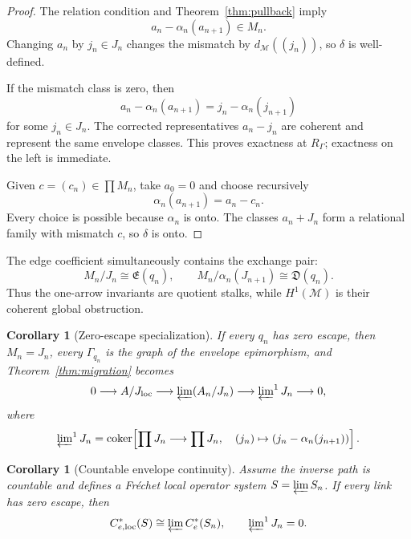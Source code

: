 \documentclass[11pt,a4paper]{amsart}
\theoremstyle{plain}
\newtheorem{corollary}[theorem]{Corollary}
\theoremstyle{definition}
\newcommand{\Ce}{C_e^*}
\newcommand{\Esc}{\mathfrak E}
\newcommand{\Def}{\mathfrak D}
\newcommand{\coker}{\operatorname{coker}}
\begin{document}
\begin{proof}
The relation condition and Theorem~\ref{thm:pullback} imply
\[
 a_n-\alpha_n(a_{n+1})\in M_n.
\]
Changing $a_n$ by $j_n\in J_n$ changes the mismatch by
$d_{\mathcal M}((j_n))$, so $\delta$ is well-defined.

If the mismatch class is zero, then
\[
 a_n-\alpha_n(a_{n+1})=j_n-\alpha_n(j_{n+1})
\]
for some $j_n\in J_n$.  The corrected representatives $a_n-j_n$ are coherent and represent the
same envelope classes.  This proves exactness at $R_\Gamma$; exactness on the left is immediate.

Given $c=(c_n)\in\prod M_n$, take $a_0=0$ and choose recursively
\[
 \alpha_n(a_{n+1})=a_n-c_n.
\]
Every choice is possible because $\alpha_n$ is onto.  The classes $a_n+J_n$ form a relational
family with mismatch $c$, so $\delta$ is onto.
\end{proof}

The edge coefficient simultaneously contains the exchange pair:
\[
 M_n/J_n\cong\Esc(q_n),\qquad
 M_n/\alpha_n(J_{n+1})\cong\Def(q_n).
\]
Thus the one-arrow invariants are quotient stalks, while $H^1(\mathcal M)$ is their coherent
global obstruction.

\begin{corollary}[Zero-escape specialization]\label{cor:roos}
If every $q_n$ has zero escape, then $M_n=J_n$, every $\Gamma_{q_n}$ is the graph of the envelope
epimorphism, and Theorem~\ref{thm:migration} becomes
\[
 0\longrightarrow A/J_{\rm loc}\longrightarrow
 \varprojlim(A_n/J_n)\longrightarrow
 \varprojlim\nolimits^1J_n\longrightarrow0,
\]
where
\[
 \varprojlim\nolimits^1J_n=
 \coker\!\left[
 \prod J_n\longrightarrow\prod J_n,\quad
 (j_n)\mapsto(j_n-\alpha_n(j_{n+1}))
 \right].
\]
\end{corollary}

\begin{corollary}[Countable envelope continuity]\label{cor:continuity}
Assume the inverse path is countable and defines a Fr\'echet local operator system
$S=\varprojlim S_n$.  If every link has zero escape, then
\[
 C_{e,\mathrm{loc}}^*(S)\cong\varprojlim\Ce(S_n),
\qquad
 \varprojlim\nolimits^1J_n=0.
\]
\end{corollary}
\end{document}
